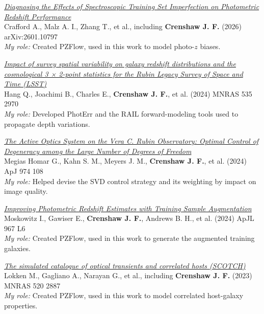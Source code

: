 \begin{etaremune}
\item \href{https://ui.adsabs.harvard.edu/abs/2026arXiv260110797C}{\textit{Diagnosing the Effects of Spectroscopic Training Set Imperfection on Photometric Redshift Performance}} \\
Crafford A., Malz A. I., Zhang T., et al., including \textbf{Crenshaw J. F.} (2026)
arXiv:2601.10797 \\
{\small \textit{My role:} Created PZFlow, used in this work to model photo-$z$ biases.}

\item \href{https://ui.adsabs.harvard.edu/abs/2024MNRAS.535.2970H}{\textit{Impact of survey spatial variability on galaxy redshift distributions and the cosmological 3 × 2-point statistics for the Rubin Legacy Survey of Space and Time (LSST)}} \\
Hang Q., Joachimi B., Charles E., \textbf{Crenshaw J. F.}, et al. (2024)
MNRAS 535 2970 \\
{\small \textit{My role:} Developed PhotErr and the RAIL forward-modeling tools used to propagate depth variations.}

\item \href{https://ui.adsabs.harvard.edu/abs/2024ApJ...974..108M}{\textit{The Active Optics System on the Vera C. Rubin Observatory: Optimal Control of Degeneracy among the Large Number of Degrees of Freedom}} \\
Megias Homar G., Kahn S. M., Meyers J. M., \textbf{Crenshaw J. F.}, et al. (2024)
ApJ 974 108 \\
{\small \textit{My role:} Helped devise the SVD control strategy and its weighting by impact on image quality.}

\item \href{https://ui.adsabs.harvard.edu/abs/2024ApJ...967L...6M}{\textit{Improving Photometric Redshift Estimates with Training Sample Augmentation}} \\
Moskowitz I., Gawiser E., \textbf{Crenshaw J. F.}, Andrews B. H., et al. (2024)
ApJL 967 L6 \\
{\small \textit{My role:} Created PZFlow, used in this work to generate the augmented training galaxies.}

\item \href{https://ui.adsabs.harvard.edu/abs/2023MNRAS.520.2887L}{\textit{The simulated catalogue of optical transients and correlated hosts (SCOTCH)}} \\
Lokken M., Gagliano A., Narayan G., et al., including \textbf{Crenshaw J. F.} (2023)
MNRAS 520 2887 \\
{\small \textit{My role:} Created PZFlow, used in this work to model correlated host-galaxy properties.}


\end{etaremune}
